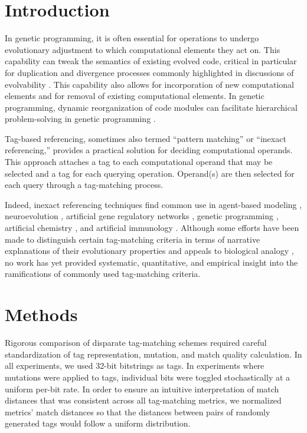 \section{Introduction} \label{sec:introduction}

In genetic programming, it is often essential for operations to undergo evolutionary adjustment to which computational elements they act on.
This capability can tweak the semantics of existing evolved code, critical in particular for duplication and divergence processes commonly highlighted in discussions of evolvability \citep{altenberg1994evolution}.
This capability also allows for incorporation of new computational elements and for removal of existing computational elements.
In genetic programming, dynamic reorganization of code modules can facilitate hierarchical problem-solving in genetic programming \citep{Kinnear:Koza:1994:adf}.

Tag-based referencing, sometimes also termed ``pattern matching'' or ``inexact referencing,'' provides a practical solution for deciding computational operands.
This approach attaches a tag to each computational operand that may be selected and a tag for each querying operation.
Operand(s) are then selected for each query through a tag-matching process.

Indeed, inexact referencing techniques find common use in agent-based modeling \citep{riolo2001evolution}, neuroevolution \citep{reisinger2007acquiring}, artificial gene regulatory networks \citep{banzhaf2003artificial}, genetic programming \citep{spector2011tag, lalejini2018evolving}, artificial chemistry \citep{dittrich2001artificial}, and artificial immunology \citep{timmis2008theoretical}.
Although some efforts have been made to distinguish certain tag-matching criteria in terms of narrative explanations of their evolutionary properties and appeals to biological analogy \citep{downing2015intelligence,scherer2004activation}, no work has yet provided systematic, quantitative, and empirical insight into the ramifications of commonly used tag-matching criteria.

\section{Methods}

Rigorous comparison of disparate tag-matching schemes required careful standardization of tag representation, mutation, and match quality calculation.
In all experiments, we used 32-bit bitstrings as tags.%
In experiments where mutations were applied to tags, individual bits were toggled stochastically at a uniform per-bit rate.
In order to ensure an intuitive interpretation of match distances that was consistent across all tag-matching metrics, we normalized metrics' match distances so that the distances between pairs of randomly generated tags would follow a uniform distribution.


